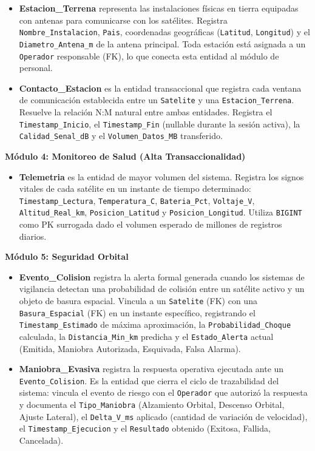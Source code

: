 \begin{itemize}
    \item \textbf{Estacion\_Terrena} representa las instalaciones físicas en tierra equipadas con antenas para comunicarse con los satélites. Registra \texttt{Nombre\_Instalacion}, \texttt{Pais}, coordenadas geográficas (\texttt{Latitud}, \texttt{Longitud}) y el \texttt{Diametro\_Antena\_m} de la antena principal. Toda estación está asignada a un \texttt{Operador} responsable (FK), lo que conecta esta entidad al módulo de personal.
    \item \textbf{Contacto\_Estacion} es la entidad transaccional que registra cada ventana de comunicación establecida entre un \texttt{Satelite} y una \texttt{Estacion\_Terrena}. Resuelve la relación N:M natural entre ambas entidades. Registra el \texttt{Timestamp\_Inicio}, el \texttt{Timestamp\_Fin} (nullable durante la sesión activa), la \texttt{Calidad\_Senal\_dB} y el \texttt{Volumen\_Datos\_MB} transferido.
\end{itemize}

\vspace{0.5cm}
\noindent \textbf{Módulo 4: Monitoreo de Salud (Alta Transaccionalidad)}

\begin{itemize}
    \item \textbf{Telemetria} es la entidad de mayor volumen del sistema. Registra los signos vitales de cada satélite en un instante de tiempo determinado: \texttt{Timestamp\_Lectura}, \texttt{Temperatura\_C}, \texttt{Bateria\_Pct}, \texttt{Voltaje\_V}, \texttt{Altitud\_Real\_km}, \texttt{Posicion\_Latitud} y \texttt{Posicion\_Longitud}. Utiliza \texttt{BIGINT} como PK surrogada dado el volumen esperado de millones de registros diarios.
\end{itemize}

\vspace{0.5cm}
\noindent \textbf{Módulo 5: Seguridad Orbital}

\begin{itemize}
    \item \textbf{Evento\_Colision} registra la alerta formal generada cuando los sistemas de vigilancia detectan una probabilidad de colisión entre un satélite activo y un objeto de basura espacial. Vincula a un \texttt{Satelite} (FK) con una \texttt{Basura\_Espacial} (FK) en un instante específico, registrando el \texttt{Timestamp\_Estimado} de máxima aproximación, la \texttt{Probabilidad\_Choque} calculada, la \texttt{Distancia\_Min\_km} predicha y el \texttt{Estado\_Alerta} actual (Emitida, Maniobra Autorizada, Esquivada, Falsa Alarma).
    \item \textbf{Maniobra\_Evasiva} registra la respuesta operativa ejecutada ante un \texttt{Evento\_Colision}. Es la entidad que cierra el ciclo de trazabilidad del sistema: vincula el evento de riesgo con el \texttt{Operador} que autorizó la respuesta y documenta el \texttt{Tipo\_Maniobra} (Alzamiento Orbital, Descenso Orbital, Ajuste Lateral), el \texttt{Delta\_V\_ms} aplicado (cantidad de variación de velocidad), el \texttt{Timestamp\_Ejecucion} y el \texttt{Resultado} obtenido (Exitosa, Fallida, Cancelada).
\end{itemize}


